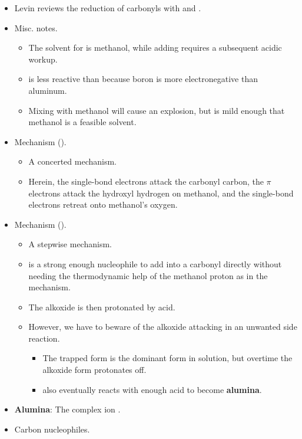 \documentclass[../notes.tex]{subfiles}
\begin{document}
\begin{itemize}
    \item Levin reviews the reduction of carbonyls with  and .
    \item Misc. notes.
    \begin{itemize}
        \item The solvent for  is methanol, while adding  requires a subsequent acidic workup.
        \item {} is less reactive than  because boron is more electronegative than aluminum.
        \item Mixing  with methanol will cause an explosion, but  is mild enough that methanol is a feasible solvent.
    \end{itemize}
    \item Mechanism ().
    \begin{itemize}
        \item A concerted mechanism.
        \item Herein, the  single-bond electrons attack the carbonyl carbon, the  $\pi$ electrons attack the hydroxyl hydrogen on methanol, and the  single-bond electrons retreat onto methanol's oxygen.
    \end{itemize}
    \item Mechanism ().
    \begin{itemize}
        \item A stepwise mechanism.
        \item {} is a strong enough nucleophile to add into a carbonyl directly without needing the thermodynamic help of the methanol proton as in the  mechanism.
        \item The alkoxide is then protonated by acid.
        \item However, we have to beware of the alkoxide attacking  in an unwanted side reaction.
        \begin{itemize}
            \item The trapped form is the dominant form in solution, but overtime the alkoxide form protonates off.
            \item {} also eventually reacts with enough acid to become \textbf{alumina}.
        \end{itemize}
    \end{itemize}
    \item \textbf{Alumina}: The complex ion .
    \item Carbon nucleophiles.

\end{itemize}
\end{document}
